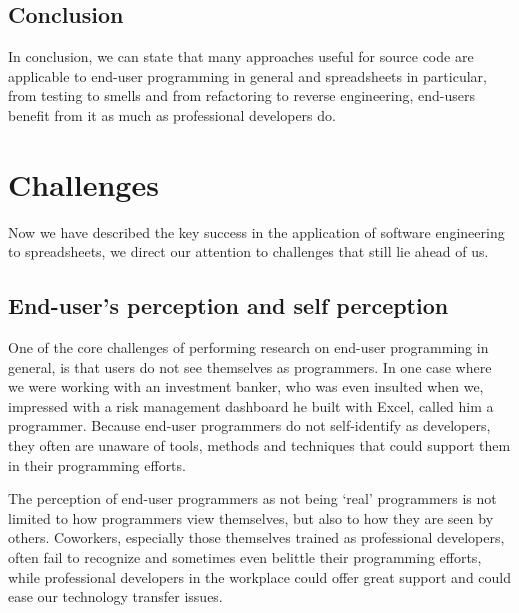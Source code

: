 \documentclass[conference]{IEEEtran}
\begin{document}
\subsection{Conclusion}
In conclusion, we can state that many approaches useful for source code are applicable to end-user programming in general and spreadsheets in particular, from testing to smells and from refactoring to reverse engineering,  end-users benefit from it as much as professional developers do.


\section{Challenges} 
Now we have described the key success in the application of software engineering to spreadsheets, we direct our attention to challenges that still lie ahead of us. 

\subsection{End-user's perception and self perception}
One of the core challenges of performing research on end-user programming in general, is that users do not see themselves as programmers. In one case where we were working with an investment banker, who was even insulted when we, impressed with a risk management dashboard he built with Excel, called him a programmer. Because end-user programmers do not self-identify as developers, they often are unaware of tools, methods and techniques that could support them in their programming efforts.

The perception of end-user programmers as not being `real' programmers is not limited to how programmers view themselves, but also to how they are seen by others. Coworkers, especially those themselves trained as professional developers, often fail to recognize and sometimes even belittle their programming efforts, while professional developers in the workplace could offer great support and could ease our technology transfer issues. 
\end{document}
